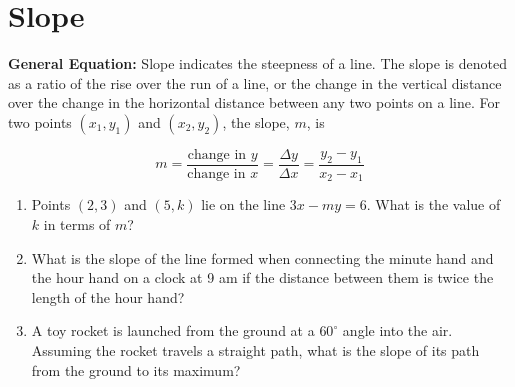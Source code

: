 \section{Slope}

\textbf{General Equation:} Slope indicates the steepness of a line. The slope is denoted as a ratio of the rise over the run of a line, or the change in the vertical distance over the change in the horizontal distance between any two points on a line. For two points $(x_1,y_1)$ and $(x_2,y_2)$, the slope, $m$, is

\[m=\frac{\textrm{change in }y}{\textrm{change in }x}=\frac{\Delta y}{\Delta x}=\frac{y_2-y_1}{x_2-x_1}\]

\vfill
\begin{enumerate}[labelindent=*,style=multiline,leftmargin=*,label=\textbf{Example \arabic*:}]
\item Points $(2,3)$ and $(5,k)$ lie on the line $3x-my=6$. What is the value of $k$ in terms of $m$?

\vfill\item What is the slope of the line formed when connecting the minute hand and the hour hand on a clock at 9 am if the distance between them is twice the length of the hour hand?

\vfill\item A toy rocket is launched from the ground at a $60^\circ$ angle into the air. Assuming the rocket travels a straight path, what is the slope of its path from the ground to its maximum?
\end{enumerate}

